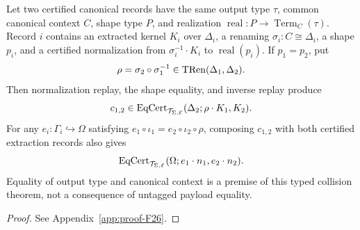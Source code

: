 \begin{corollary}
\label{cor:collision-cert}
Let two certified canonical records have the same output type $\tau$, common
canonical context $C$, shape type $P$, and realization
$\operatorname{real}:P\to\operatorname{Term}_C(\tau)$.  Record $i$ contains
an extracted kernel $K_i$ over $\Delta_i$, a renaming
$\sigma_i:C\cong\Delta_i$, a shape $p_i$, and a certified normalization from
$\sigma_i^{-1}\cdot K_i$ to $\operatorname{real}(p_i)$.  If $p_1=p_2$, put
\[
\rho=\sigma_2\circ\sigma_1^{-1}\in\operatorname{TRen}(\Delta_1,\Delta_2).
\]
Then normalization replay, the shape equality, and inverse replay produce
\[
c_{1,2}\in
\operatorname{EqCert}_{\mathcal T_{\Sigma,\mathcal E}}
(\Delta_2;\rho\cdot K_1,K_2).
\]
For any $e_i:\Gamma_i\hookrightarrow\Omega$ satisfying
$e_1\circ\iota_1=e_2\circ\iota_2\circ\rho$, composing $c_{1,2}$ with both
certified extraction records also gives
\[
\operatorname{EqCert}_{\mathcal T_{\Sigma,\mathcal E}}
(\Omega;e_1\cdot n_1,e_2\cdot n_2).
\]
Equality of output type and canonical context is a premise of this typed
collision theorem, not a consequence of untagged payload equality.
\end{corollary}
\begin{proof}See Appendix~\ref{app:proof-F26}.\end{proof}

